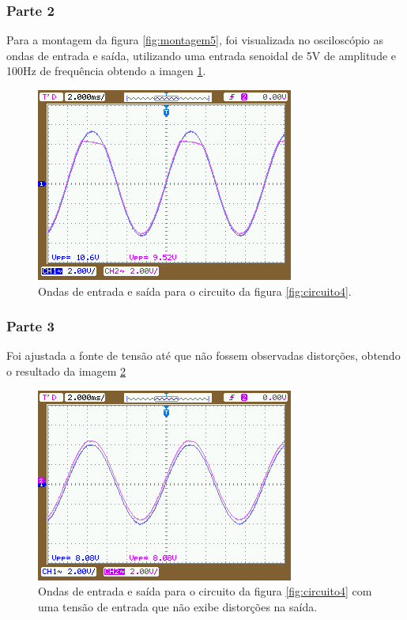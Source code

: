 \documentclass{abntex2}
\begin{document}
\subsubsection{Parte 2}
Para a montagem da figura \ref{fig:montagem5}, foi visualizada no osciloscópio as ondas de entrada e saída, utilizando uma entrada senoidal de 5V de amplitude e 100Hz de frequência obtendo a imagen \ref{fig:inout3}.
\begin{figure}[h]
  \centering
  \includegraphics[scale = 0.5]{NewFile3.png}
  \caption{Ondas de entrada e saída para o circuito da figura \ref{fig:circuito4}.}
  \label{fig:inout3}
\end{figure}

\subsubsection{Parte 3}

Foi ajustada a fonte de tensão até que não fossem observadas distorções, obtendo o resultado da imagem \ref{fig:inout4}
\begin{figure}[h]
  \centering
  \includegraphics[scale = 0.5]{NewFile4.png}
  \caption{Ondas de entrada e saída para o circuito da figura \ref{fig:circuito4} com uma tensão de entrada que não exibe distorções na saída.}
  \label{fig:inout4}
\end{figure}
\end{document}
